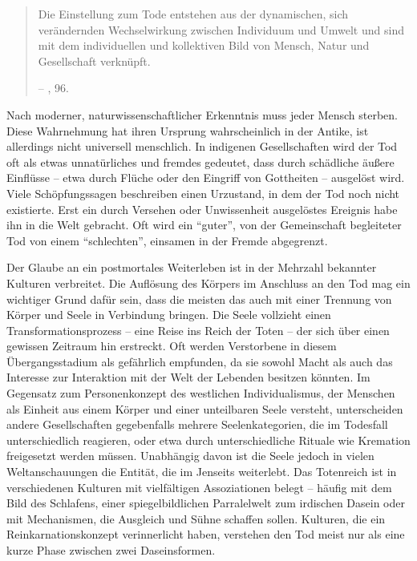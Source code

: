 \documentclass[openany,twoside,twocolumn]{book}
\begin{document}
\begin{quote}
Die Einstellung zum Tode entstehen aus der dynamischen, sich
verändernden Wechselwirkung zwischen Individuum und Umwelt und sind mit
dem individuellen und kollektiven Bild von Mensch, Natur und
Gesellschaft verknüpft.

-- \textcite{hofmann_rituelle_2008}, 96.
\end{quote}

Nach moderner, naturwissenschaftlicher Erkenntnis muss jeder Mensch
sterben. Diese Wahrnehmung hat ihren Ursprung wahrscheinlich in der
Antike, ist allerdings nicht universell menschlich. In indigenen
Gesellschaften wird der Tod oft als etwas unnatürliches und fremdes
gedeutet, dass durch schädliche äußere Einflüsse -- etwa durch Flüche
oder den Eingriff von Gottheiten -- ausgelöst wird. Viele
Schöpfungssagen beschreiben einen Urzustand, in dem der Tod noch nicht
existierte. Erst ein durch Versehen oder Unwissenheit ausgelöstes
Ereignis habe ihn in die Welt gebracht. Oft wird ein ``guter'', von der
Gemeinschaft begleiteter Tod von einem ``schlechten'', einsamen in der
Fremde abgegrenzt.

Der Glaube an ein postmortales Weiterleben ist in der Mehrzahl bekannter
Kulturen verbreitet. Die Auflösung des Körpers im Anschluss an den Tod
mag ein wichtiger Grund dafür sein, dass die meisten das auch mit einer
Trennung von Körper und Seele in Verbindung bringen. Die Seele vollzieht
einen Transformationsprozess -- eine Reise ins Reich der Toten -- der
sich über einen gewissen Zeitraum hin erstreckt. Oft werden Verstorbene
in diesem Übergangsstadium als gefährlich empfunden, da sie sowohl Macht
als auch das Interesse zur Interaktion mit der Welt der Lebenden
besitzen könnten. Im Gegensatz zum Personenkonzept des westlichen
Individualismus, der Menschen als Einheit aus einem Körper und einer
unteilbaren Seele versteht, unterscheiden andere Gesellschaften
gegebenfalls mehrere Seelenkategorien, die im Todesfall unterschiedlich
reagieren, oder etwa durch unterschiedliche Rituale wie Kremation
freigesetzt werden müssen. Unabhängig davon ist die Seele jedoch in
vielen Weltanschauungen die Entität, die im Jenseits weiterlebt. Das
Totenreich ist in verschiedenen Kulturen mit vielfältigen Assoziationen
belegt -- häufig mit dem Bild des Schlafens, einer spiegelbildlichen
Parralelwelt zum irdischen Dasein oder mit Mechanismen, die Ausgleich
und Sühne schaffen sollen. Kulturen, die ein Reinkarnationskonzept
verinnerlicht haben, verstehen den Tod meist nur als eine kurze Phase
zwischen zwei Daseinsformen.
\end{document}
